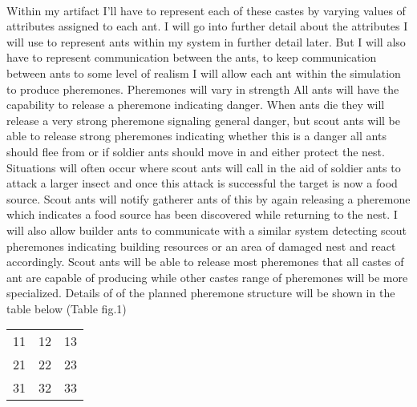 \documentclass{report}
\begin{document}
\paragraph{}Within my artifact I'll have to represent each of these castes by varying values of attributes assigned to each ant. I will go into further detail about the attributes I will use to represent ants within my system in further detail later. But I will also have to represent communication between the ants, to keep communication between ants to some level of realism I will allow each ant within the simulation to produce pheremones. Pheremones will vary in strength  All ants will have the capability to release a pheremone indicating danger. When ants die they will release a very strong pheremone signaling general danger, but scout ants will be able to release strong pheremones indicating whether this is a danger all ants should flee from or if soldier ants should move in and either protect the nest. Situations will often occur where scout ants will call in the aid of soldier ants to attack a larger insect and once this attack is successful the target is now a food source. Scout ants will notify gatherer ants of this by again releasing a pheremone which indicates a food source has been discovered while returning to the nest. I will also allow builder ants to communicate with a similar system detecting scout pheremones indicating building resources or an area of damaged nest and react accordingly. Scout ants will be able to release most pheremones that all castes of ant are capable of producing while other castes range of pheremones will be more specialized. Details of of the planned pheremone structure will be shown in the table below (Table fig.1)

\begin{center}
	\begin{tabular}{lll}
		11 & 12 & 13 \\
		21 & 22 & 23 \\
		31 & 32 & 33 \\
	\end{tabular}
	\label{tab:}
\end{center}
\end{document}
